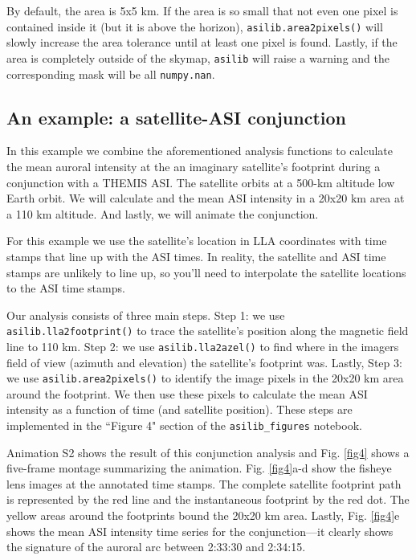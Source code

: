 \documentclass[utf8]{FrontiersinHarvard} %
\begin{document}
By default, the area is 5x5 km. If the area is so small that not even one pixel is contained inside it (but it is above the horizon), \verb|asilib.area2pixels()| will slowly increase the area tolerance until at least one pixel is found. Lastly, if the area is completely outside of the skymap, \verb|asilib| will raise a warning and the corresponding mask will be all \verb|numpy.nan|. 

\subsection{An example: a satellite-ASI conjunction}\label{satellite_conjunction}
In this example we combine the aforementioned analysis functions to calculate the mean auroral intensity at the an imaginary satellite's footprint during a conjunction with a THEMIS ASI. The satellite orbits at a 500-km altitude low Earth orbit. We will calculate and the mean ASI intensity in a 20x20 km area at a 110 km altitude. And lastly, we will animate the conjunction.

For this example we use the satellite's location in LLA coordinates with time stamps that line up with the ASI times. In reality, the satellite and ASI time stamps are unlikely to line up, so you'll need to interpolate the satellite locations to the ASI time stamps.

Our analysis consists of three main steps. Step 1: we use \verb|asilib.lla2footprint()| to trace the satellite's position along the magnetic field line to 110 km. Step 2: we use \verb|asilib.lla2azel()| to find where in the imagers field of view (azimuth and elevation) the satellite's footprint was. Lastly, Step 3: we use \verb|asilib.area2pixels()| to identify the image pixels in the 20x20 km area around the footprint. We then use these pixels to calculate the mean ASI intensity as a function of time (and satellite position). These steps are implemented in the ``Figure 4" section of the \verb|asilib_figures| notebook.

Animation S2 shows the result of this conjunction analysis and Fig. \ref{fig4} shows a five-frame montage summarizing the animation. Fig. \ref{fig4}a-d show the fisheye lens images at the annotated time stamps. The complete satellite footprint path is represented by the red line and the instantaneous footprint by the red dot. The yellow areas around the footprints bound the 20x20 km area. Lastly, Fig. \ref{fig4}e shows the mean ASI intensity time series for the conjunction---it clearly shows the signature of the auroral arc between 2:33:30 and 2:34:15.
\end{document}
